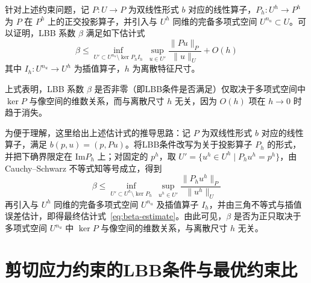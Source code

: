 \documentclass[internationalmaster]{hquThesis}
\begin{document}
针对上述约束问题，记 $P:U\to P$ 为双线性形式 $b$ 对应的线性算子，$P_h:U^{h}\to P^{h}$ 为 $P$ 在 $P^{h}$ 上的正交投影算子，并引入与 $U^{h}$ 同维的完备多项式空间 $U^{n_u}\subset U$。可以证明，LBB 系数 $\beta$ 满足如下估计式
\begin{equation}
    \beta \leq \inf_{U'\subset U^{n_u}\setminus\ker P_h I_h}\ \sup_{u\in U'}
    \frac{\| Pu\|_P}{\| u\|_U} + O(h)
    \label{eq:beta-estimate}
\end{equation}
其中 $I_h:U^{n_u}\to U^{h}$ 为插值算子，$h$ 为离散特征尺寸。

上式表明，LBB 系数 $\beta$ 是否非零（即LBB条件是否满足）仅取决于多项式空间中 $\ker P$ 与像空间的维数关系，而与离散尺寸 $h$ 无关，因为 $O(h)$ 项在 $h\to0$ 时趋于消失。

为便于理解，这里给出上述估计式的推导思路：记 $P$ 为双线性形式 $b$ 对应的线性算子，满足 $b(p,u)=(p,Pu)$。将LBB条件改写为关于投影算子 $P_h$ 的形式，并把下确界限定在 $\mathrm{Im}P_h$ 上；对固定的 $p^{h}$，取 $U'=\{u^{h}\in U^{h}\mid P_h u^{h}=p^{h}\}$，由 Cauchy--Schwarz 不等式知等号成立，得到
\begin{equation}
    \beta \leq \inf_{U'\subset U^{h}\setminus\ker P_h}\ \sup_{u^{h}\in U'}
    \frac{\| P_h u^{h}\|_P}{\| u^{h}\|_U}
    \label{eq:beta-projection}
\end{equation}
再引入与 $U^{h}$ 同维的完备多项式空间 $U^{n_u}$ 及插值算子 $I_h$，并由三角不等式与插值误差估计，即得最终估计式~\eqref{eq:beta-estimate}。由此可见，$\beta$ 是否为正只取决于多项式空间 $U^{n_u}$ 中 $\ker P$ 与像空间的维数关系，与离散尺寸 $h$ 无关。

\section{剪切应力约束的LBB条件与最优约束比}
\end{document}
